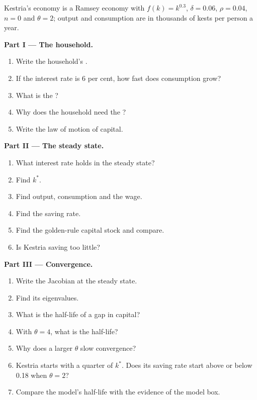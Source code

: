 \begin{problem}
\label{pb:b2:ramsey-model:1}
Kestria's economy is a Ramsey economy with $f(k) = k^{0.3}$, $\delta = 0.06$, $\rho = 0.04$, $n = 0$ and $\theta = 2$; output and consumption are in thousands of kests per person a
year.

\medskip
\noindent\textbf{Part I --- The household.}
\begin{enumerate}
  \item Write the household's .
  \item If the interest rate is 6 per cent, how fast does consumption grow?
  \item What is the ?
  \item Why does the household need the ?
  \item Write the law of motion of capital.
\end{enumerate}

\medskip
\noindent\textbf{Part II --- The steady state.}
\begin{enumerate}[resume]
  \item What interest rate holds in the steady state?
  \item Find $k^*$.
  \item Find output, consumption and the wage.
  \item Find the saving rate.
  \item Find the golden-rule capital stock and compare.
  \item Is Kestria saving too little?
\end{enumerate}

\medskip
\noindent\textbf{Part III --- Convergence.}
\begin{enumerate}[resume]
  \item Write the Jacobian at the steady state.
  \item Find its eigenvalues.
  \item What is the half-life of a gap in capital?
  \item With $\theta = 4$, what is the half-life?
  \item Why does a larger $\theta$ slow convergence?
  \item Kestria starts with a quarter of $k^*$. Does its saving rate start above or below 0.18 when $\theta = 2$?
  \item Compare the model's half-life with the evidence of the model box.
\end{enumerate}


\end{problem}
